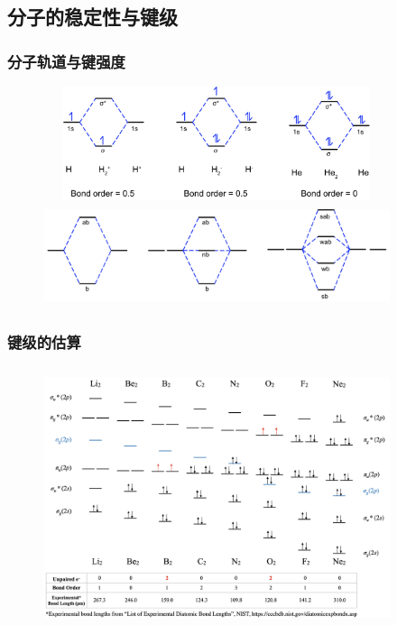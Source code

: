 {\subsection{分子的稳定性与键级}
\frame
{
	\frametitle{分子轨道与键强度}
\begin{figure}[h!]
\centering
\vspace{-10.5pt}
\includegraphics[height=1.30in,width=4.00in,viewport=0 0 325 110,clip]{Figures/MO-diagrams_H2He2.png}
\includegraphics[height=1.20in,width=4.00in,viewport=0 0 360 100,clip]{Figures/multi-orbital.png}
\label{MO:H2-He}
\end{figure}
}

\frame
{
	\frametitle{键级的估算}
\begin{figure}[h!]
\centering
\vspace{-10.5pt}
\includegraphics[height=3.00in,width=4.00in,viewport=0 0 1500 1050,clip]{Figures/Band-order.png}
\label{Bond_Order}
\end{figure}
}

}
